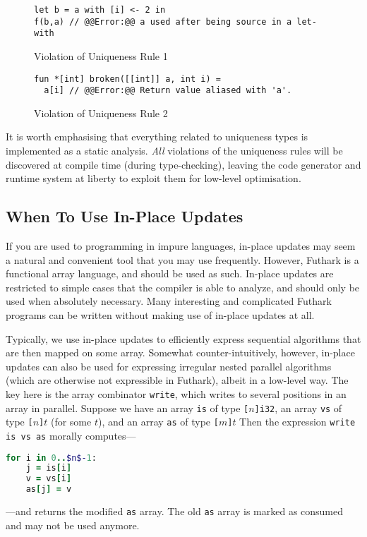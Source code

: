 \documentclass[11pt]{book}
\begin{document}
\begin{figure}
\centering
\begin{lstlisting}
let b = a with [i] <- 2 in
f(b,a) // @@Error:@@ a used after being source in a let-with
\end{lstlisting}
\caption{Violation of Uniqueness Rule 1}
\label{fig:uniqueness-rule-1-violation}
\end{figure}

\begin{figure}
\centering
\begin{lstlisting}
fun *[int] broken([[int]] a, int i) =
  a[i] // @@Error:@@ Return value aliased with 'a'.
\end{lstlisting}
\caption{Violation of Uniqueness Rule 2}
\label{fig:uniqueness-rule-2-violation}
\end{figure}

It is worth emphasising that everything related to uniqueness types is
implemented as a static analysis.  \textit{All} violations of the
uniqueness rules will be discovered at compile time (during
type-checking), leaving the code generator and runtime system at
liberty to exploit them for low-level optimisation.

\subsection{When To Use In-Place Updates}

If you are used to programming in impure languages, in-place updates
may seem a natural and convenient tool that you may use frequently.
However, Futhark is a functional array language, and should be used as
such.  In-place updates are restricted to simple cases that the
compiler is able to analyze, and should only be used when absolutely
necessary.  Many interesting and complicated Futhark programs can be
written without making use of in-place updates at all.

Typically, we use in-place updates to efficiently express sequential
algorithms that are then mapped on some array.  Somewhat
counter-intuitively, however, in-place updates can also be used for
expressing irregular nested parallel algorithms (which are otherwise
not expressible in Futhark), albeit in a low-level way.  The key here
is the array combinator \texttt{write}, which writes to several
positions in an array in parallel.  Suppose we have an array
\texttt{is} of type \texttt{[$n$]i32}, an array \texttt{vs} of type
\texttt{[$n$]$t$} (for some \texttt{$t$}), and an array \texttt{as}
of type \texttt{[$m$]$t$} Then the expression \texttt{write is vs
  as} morally computes---
\begin{lstlisting}[language=ruby,mathescape=true]
  for i in 0..$n$-1:
    j = is[i]
    v = vs[i]
    as[j] = v
\end{lstlisting}
---and returns the modified \texttt{as} array.  The old \texttt{as}
array is marked as consumed and may not be used anymore.
\end{document}
